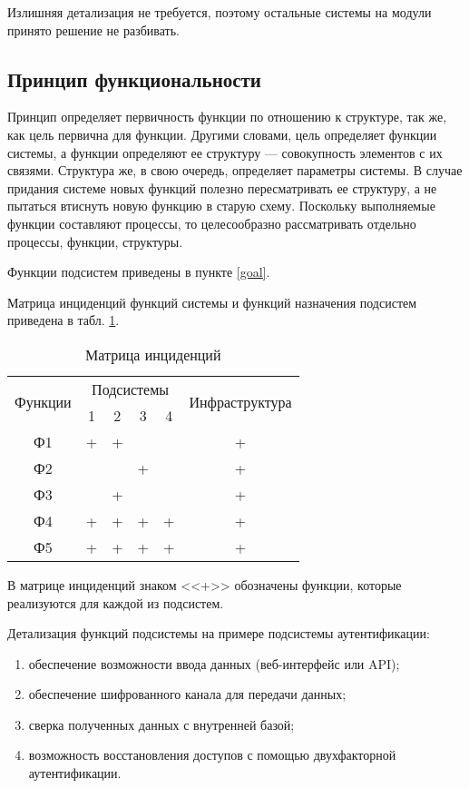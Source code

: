 
Излишняя детализация не требуется, поэтому остальные системы на модули принято решение не разбивать.

\subsection{Принцип функциональности}

Принцип определяет первичность функции по отношению к структуре, так же, как цель первична для функции.
Другими словами, цель определяет функции системы, а функции определяют ее структуру --- совокупность элементов с их связями.
Структура же, в свою очередь, определяет параметры системы.
В случае придания системе новых функций полезно пересматривать ее структуру, а не пытаться втиснуть новую функцию в старую схему.
Поскольку выполняемые функции составляют процессы, то целесообразно рассматривать отдельно процессы, функции, структуры.

Функции подсистем приведены в пункте \ref{goal}.

Матрица инциденций функций системы и функций назначения подсистем приведена в табл. \ref{inc-matrix}.
\begin{table}[H]
  \caption{Матрица инциденций}\label{inc-matrix}
  \begin{tabular}{|c|c|c|c|c|c|}
  \hline \multirow{2}{*}{Функции} & \multicolumn{4}{|c|}{Подсистемы} & \multirow{2}{*}{Инфраструктура} \\
  \cline{2-5} & 1 & 2 & 3 & 4 & \\
  \hline Ф1 & + & + & & & + \\
  \hline Ф2 & & & + & & + \\
  \hline Ф3 & & + & & & + \\
  \hline Ф4 & + & + & + & + & + \\
  \hline Ф5 & + & + & + & + & + \\
  \hline
  \end{tabular}
\end{table}

В матрице инциденций знаком <<+>> обозначены функции, которые реализуются для каждой из подсистем.

Детализация функций подсистемы на примере подсистемы аутентификации:
\begin{enumerate}
  \item обеспечение возможности ввода данных (веб-интерфейс или API);
  \item обеспечение шифрованного канала для передачи данных;
  \item сверка полученных данных с внутренней базой;
  \item возможность восстановления доступов с помощью двухфакторной аутентификации.
\end{enumerate}

